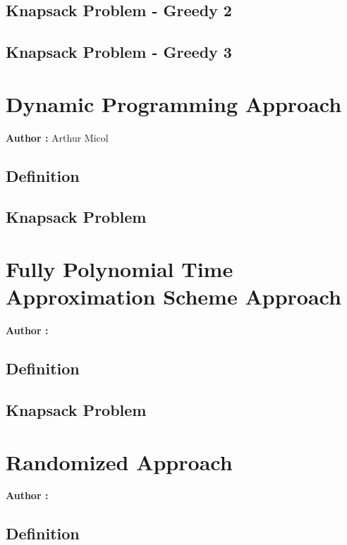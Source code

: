 \documentclass[12pt]{article}
\begin{document}
    \subsection{Knapsack Problem - Greedy 2}
    
    \subsection{Knapsack Problem - Greedy 3}

\section{Dynamic Programming Approach}

    \textbf{Author :} Arthur Micol

    \subsection{Definition}
    
    \subsection{Knapsack Problem}

\section{Fully Polynomial Time Approximation Scheme Approach}

    \textbf{Author :} 

    \subsection{Definition}
    
    \subsection{Knapsack Problem}

\section{Randomized Approach}

    \textbf{Author :}

    \subsection{Definition}
    
\end{document}
